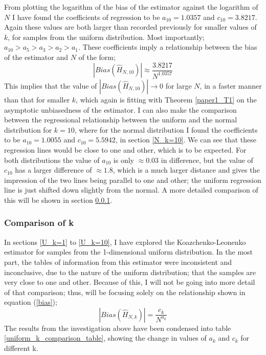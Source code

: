 \documentclass{article}
\begin{document}
From plotting the logarithm of the bias of the estimator against the logarithm of $N$ I have found the coefficients of regression to be $a_{10} = 1.0357$ and $c_{10}=3.8217$. Again these values are both larger than recorded previously for smaller values of $k$, for samples from the uniform distribution. Most importantly; $a_{10} > a_{5} > a_{3} > a_{2} > a_{1}$. These coefficients imply a relationship between the bias of the estimator and $N$ of the form;
\begin{equation}
|Bias(\hat{H}_{N, 10})| \approx \frac{3.8217}{N^{1.0357}}\nonumber
\end{equation}
This implies that the value of $|Bias(\hat{H}_{N, 10})| \to 0$ for large $N$, in a faster manner than that for smaller $k$, which again is fitting with Theorem \ref{paper1_T1} on the asymptotic unbiasedness of the estimator. I can also make the comparison between the regressional relationship between the uniform and the normal distribution for $k=10$, where for the normal distribution I found the coefficients to be $a_{10}=1.0055$ and $c_{10}=5.5942$, in section \ref{N_k=10}. We can see that these regression lines would be close to one and other, which is to be expected. For both distributions the value of $a_{10}$ is only $\approx 0.03$ in difference, but the value of $c_{10}$ has a larger difference of $\approx 1.8$, which is a much larger distance and gives the impression of the two lines being parallel to one and other; the uniform regression line is just shifted down slightly from the normal. A more detailed comparison of this will be shown in section \ref{U_compare_k}.





\subsubsection{Comparison of k} \label{U_compare_k}
In sections \ref{U_k=1} to \ref{U_k=10}, I have explored the Koazchenko-Leonenko estimator for samples from the 1-dimensional uniform distribution. In the most part, the tables of information from this estimator were inconsistent and inconclusive, due to the nature of the uniform distribution; that the samples are very close to one and other. Because of this, I will not be going into more detail of that comparison; thus, will be focusing solely on the relationship shown in equation (\ref{bias});
\begin{equation}
|Bias(\hat{H}_{N, k})| = \frac{c_{k}}{N^{a_{k}}} \nonumber
\end{equation}
The results from the investigation above have been condensed into table \ref{uniform_k_comparison_table}, showing the change in values of $a_{k}$ and $c_{k}$ for different {k}.
\end{document}
